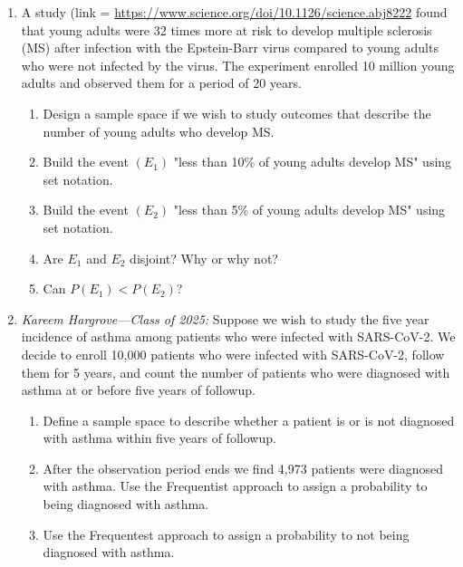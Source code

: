\begin{enumerate}
   \item A study (link = \href{here}{https://www.science.org/doi/10.1126/science.abj8222} found that young adults were 32 times more at risk to develop multiple sclerosis (MS) after infection with the Epstein-Barr virus compared to young adults who were not infected by the virus. The experiment enrolled 10 million young adults and observed them for a period of 20 years.
   \begin{enumerate}
       \item Design a sample space if we wish to study outcomes that describe the number of young adults who develop MS. 
       \item Build the event $(E_{1})$ "less than 10\% of young adults develop MS" using set notation.
       \item Build the event $(E_{2})$ "less than 5\% of young adults develop MS" using set notation.
       \item Are $E_{1}$ and $E_{2}$ disjoint? Why or why not?
       \item Can $P(E_{1}) < P(E_{2})$?
   \end{enumerate}
   
   
   \item \textit{Kareem Hargrove---Class of 2025:} Suppose we wish to study the five year incidence of asthma among patients who were infected with SARS-CoV-2. We decide to enroll 10,000 patients who were infected with SARS-CoV-2, follow them for 5 years, and count the number of patients who were diagnosed with asthma at or before five years of followup. 
   \begin{enumerate}
       \item Define a sample space to describe whether a patient is or is not diagnosed with asthma within five years of followup.
       \item After the observation period ends we find 4,973 patients were diagnosed with asthma. Use the Frequentist approach to assign a probability to being diagnosed with asthma.
       \item Use the Frequentest approach to assign a probability to not being diagnosed with asthma.
   \end{enumerate}
   

\end{enumerate}
